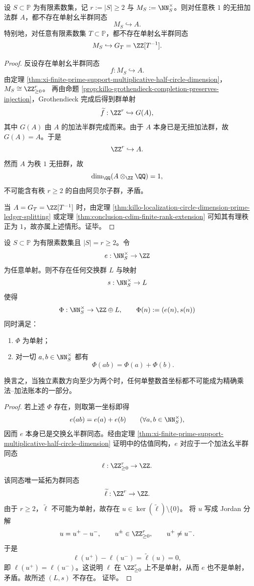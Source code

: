 \begin{theorem}[秩一无扭加法账本无法忠实承载两素数以上的乘法算术]\label{thm:xi-finite-prime-support-no-rankone-additive-host}
设 \(S\subset\mathbb P\) 为有限素数集，记 \(r:=|S|\ge 2\) 与 \(M_S:=\NN_S^\times\)。则对任意秩 \(1\) 的无扭加法群 \(A\)，都不存在单射幺半群同态
\[
M_S\hookrightarrow A.
\]
特别地，对任意有限素数集 \(T\subset\mathbb P\)，都不存在单射幺半群同态
\[
M_S\hookrightarrow G_T=\ZZ[T^{-1}].
\]
\end{theorem}
\begin{proof}
反设存在单射幺半群同态
\[
f:M_S\hookrightarrow A.
\]
由定理 \ref{thm:xi-finite-prime-support-multiplicative-half-circle-dimension}，\(M_S\cong \ZZ_{\ge 0}^{r}\)。
再由命题 \ref{prop:killo-grothendieck-completion-preserves-injection}，Grothendieck 完成后得到群单射
\[
\widetilde f:\ZZ^r\hookrightarrow G(A),
\]
其中 \(G(A)\) 由 \(A\) 的加法半群完成而来。由于 \(A\) 本身已是无扭加法群，故 \(G(A)=A\)。于是
\[
\ZZ^r\hookrightarrow A.
\]
然而 \(A\) 为秩 \(1\) 无扭群，故
\[
\dim_{\QQ}(A\otimes_{\ZZ}\QQ)=1,
\]
不可能含有秩 \(r\ge 2\) 的自由阿贝尔子群，矛盾。

当 \(A=G_T=\ZZ[T^{-1}]\) 时，由定理 \ref{thm:killo-localization-circle-dimension-prime-ledger-splitting} 或定理 \ref{thm:conclusion-cdim-finite-rank-extension} 可知其有理秩正为 \(1\)，故亦属上述情形。证毕。
\end{proof}

\begin{theorem}[单整数首坐标无法参与有限素数支撑乘法单子的精确加性账本]\label{thm:xi-single-integer-coordinate-no-exact-additive-ledger}
设 \(S\subset\mathbb P\) 为有限素数集且 \(|S|=r\ge 2\)。令
\[
e:\NN_S^\times\to \ZZ
\]
为任意单射。则不存在任何交换群 \(L\) 与映射
\[
s:\NN_S^\times\to L
\]
使得
\[
\Phi:\NN_S^\times\to \ZZ\oplus L,
\qquad
\Phi(n):=(e(n),s(n))
\]
同时满足：
\begin{enumerate}
  \item \(\Phi\) 为单射；
  \item 对一切 \(a,b\in \NN_S^\times\) 都有
  \[
  \Phi(ab)=\Phi(a)+\Phi(b).
  \]
\end{enumerate}
换言之，当独立素数方向至少为两个时，任何单整数首坐标都不可能成为精确乘法--加法账本的一部分。
\end{theorem}
\begin{proof}
若上述 \(\Phi\) 存在，则取第一坐标即得
\[
e(ab)=e(a)+e(b)
\qquad
(\forall a,b\in \NN_S^\times),
\]
因而 \(e\) 本身已是交换幺半群同态。经由定理
\ref{thm:xi-finite-prime-support-multiplicative-half-circle-dimension} 证明中的估值同构，\(e\) 对应于一个加法幺半群同态
\[
\ell:\ZZ_{\ge 0}^{r}\to \ZZ.
\]
该同态唯一延拓为群同态
\[
\widetilde\ell:\ZZ^r\to \ZZ.
\]
由于 \(r\ge 2\)，\(\widetilde\ell\) 不可能为单射，故存在
\(
u\in \ker(\widetilde\ell)\setminus\{0\}
\)。
将 \(u\) 写成 Jordan 分解
\[
u=u^+-u^-,
\qquad
u^\pm\in \ZZ_{\ge 0}^{r},
\qquad
u^+\neq u^-.
\]
于是
\[
\ell(u^+)-\ell(u^-)=\widetilde\ell(u)=0,
\]
即 \(\ell(u^+)=\ell(u^-)\)。这说明 \(\ell\) 在 \(\ZZ_{\ge 0}^{r}\) 上不是单射，从而 \(e\) 也不是单射，矛盾。故所述 \((L,s)\) 不存在。
证毕。
\end{proof}

